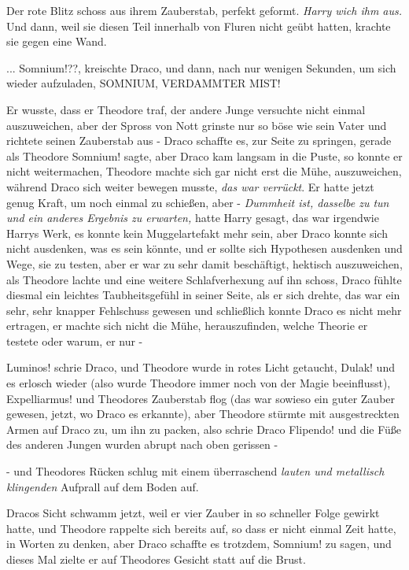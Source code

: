 Der rote Blitz schoss aus ihrem Zauberstab, perfekt geformt. \emph{Harry wich
ihm aus.} Und dann, weil sie diesen Teil innerhalb von Fluren nicht geübt
hatten, krachte sie gegen eine Wand.

... \glqq{}Somnium!??\grqq{}, kreischte Draco, und dann, nach nur wenigen
Sekunden, um sich wieder aufzuladen, \glqq{}SOMNIUM, VERDAMMTER MIST!\grqq{}

Er wusste, dass er Theodore traf, der andere Junge versuchte nicht einmal
auszuweichen, aber der Spross von Nott grinste nur so böse wie sein Vater und
richtete seinen Zauberstab aus - Draco schaffte es, zur Seite zu springen,
gerade als Theodore \glqq{}Somnium!\grqq{} sagte, aber Draco kam langsam in die
Puste, so konnte er nicht weitermachen, Theodore machte sich gar nicht erst die
Mühe, auszuweichen, während Draco sich weiter bewegen musste, \emph{das war
verrückt}. Er hatte jetzt genug Kraft, um noch einmal zu schießen, aber -
\emph{Dummheit ist, dasselbe zu tun und ein anderes Ergebnis zu erwarten,} hatte
Harry gesagt, das war irgendwie Harrys Werk, es konnte kein Muggelartefakt mehr
sein, aber Draco konnte sich nicht ausdenken, was es sein könnte, und er sollte
sich Hypothesen ausdenken und Wege, sie zu testen, aber er war zu sehr damit
beschäftigt, hektisch auszuweichen, als Theodore lachte und eine weitere
Schlafverhexung auf ihn schoss, Draco fühlte diesmal ein leichtes
Taubheitsgefühl in seiner Seite, als er sich drehte, das war ein sehr, sehr
knapper Fehlschuss gewesen und schließlich konnte Draco es nicht mehr ertragen,
er machte sich nicht die Mühe, herauszufinden, welche Theorie er testete oder
warum, er nur -

\glqq{}Luminos!\grqq{} schrie Draco, und Theodore wurde in rotes Licht getaucht,
\glqq{}Dulak!\grqq{} und es erlosch wieder (also wurde Theodore immer noch von
der Magie beeinflusst), \glqq{}Expelliarmus!\grqq{} und Theodores Zauberstab flog
(das war sowieso ein guter Zauber gewesen, jetzt, wo Draco es erkannte), aber
Theodore stürmte mit ausgestreckten Armen auf Draco zu, um ihn zu packen, also
schrie Draco \glqq{}Flipendo!\grqq{} und die Füße des anderen Jungen wurden
abrupt nach oben gerissen -

- und Theodores Rücken schlug mit einem überraschend \emph{lauten und metallisch
klingenden} Aufprall auf dem Boden auf.

Dracos Sicht schwamm jetzt, weil er vier Zauber in so schneller Folge gewirkt
hatte, und Theodore rappelte sich bereits auf, so dass er nicht einmal Zeit
hatte, in Worten zu denken, aber Draco schaffte es trotzdem, \glqq{}
Somnium!\grqq{} zu sagen, und dieses Mal zielte er auf Theodores Gesicht statt
auf die Brust.


